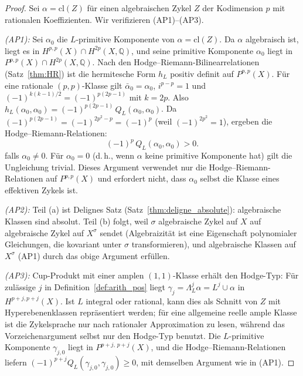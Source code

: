 \documentclass[aps,prd,twocolumn,superscriptaddress,nofootinbib]{revtex4-2}
\theoremstyle{definition}
\theoremstyle{remark}
\begin{document}
\begin{proof}
Sei $\alpha = \mathrm{cl}(Z)$ für einen algebraischen Zykel $Z$ der Kodimension $p$ mit rationalen Koeffizienten. Wir verifizieren (AP1)--(AP3).

\textit{(AP1):} Sei $\alpha_0$ die $L$-primitive Komponente von $\alpha = \mathrm{cl}(Z)$. Da $\alpha$ algebraisch ist, liegt es in $H^{p,p}(X) \cap H^{2p}(X, \mathbb{Q})$, und seine primitive Komponente $\alpha_0$ liegt in $P^{p,p}(X) \cap H^{2p}(X, \mathbb{Q})$. Nach den Hodge--Riemann-Bilinearrelationen (Satz~\ref{thm:HR}) ist die hermitesche Form $h_L$ positiv definit auf $P^{p,p}(X)$. Für eine rationale $(p,p)$-Klasse gilt $\bar{\alpha}_0 = \alpha_0$, $i^{p-p} = 1$ und $(-1)^{k(k-1)/2} = (-1)^{p(2p-1)}$ mit $k = 2p$. Also $h_L(\alpha_0, \alpha_0) = (-1)^{p(2p-1)}\, Q_L(\alpha_0, \alpha_0)$. Da $(-1)^{p(2p-1)} = (-1)^{2p^2 - p} = (-1)^p$ (weil $(-1)^{2p^2} = 1$), ergeben die Hodge--Riemann-Relationen:
\begin{equation}
(-1)^p\, Q_L(\alpha_0, \alpha_0) > 0.
\end{equation}
falls $\alpha_0 \neq 0$. Für $\alpha_0 = 0$ (d.\,h., wenn $\alpha$ keine primitive Komponente hat) gilt die Ungleichung trivial. Dieses Argument verwendet nur die Hodge--Riemann-Relationen auf $P^{p,p}(X)$ und erfordert nicht, dass $\alpha_0$ selbst die Klasse eines effektiven Zykels ist.

\textit{(AP2):} Teil (a) ist Delignes Satz (Satz~\ref{thm:deligne_absolute}): algebraische Klassen sind absolut. Teil (b) folgt, weil $\sigma$ algebraische Zykel auf $X$ auf algebraische Zykel auf $X^\sigma$ sendet (Algebraizität ist eine Eigenschaft polynomialer Gleichungen, die kovariant unter $\sigma$ transformieren), und algebraische Klassen auf $X^\sigma$ (AP1) durch das obige Argument erfüllen.

\textit{(AP3):} Cup-Produkt mit einer amplen $(1,1)$-Klasse erhält den Hodge-Typ: Für zulässige $j$ in Definition~\ref{def:arith_pos} liegt $\gamma_j=\Lambda_L^j\alpha=L^j\cup\alpha$ in $H^{p+j,p+j}(X)$. Ist $L$ integral oder rational, kann dies als Schnitt von $Z$ mit Hyperebenenklassen repräsentiert werden; für eine allgemeine reelle ample Klasse ist die Zykelsprache nur nach rationaler Approximation zu lesen, während das Vorzeichenargument selbst nur den Hodge-Typ benutzt. Die $L$-primitive Komponente $\gamma_{j,0}$ liegt in $P^{p+j,\,p+j}(X)$, und die Hodge--Riemann-Relationen liefern $(-1)^{p+j} Q_L(\gamma_{j,0}, \gamma_{j,0}) \geq 0$, mit demselben Argument wie in (AP1).
\end{proof}
\end{document}
